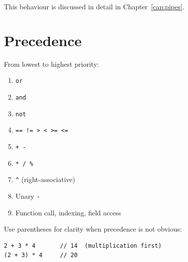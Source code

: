 This behaviour is discussed in detail in Chapter~\ref{cap:pipes}.

\section{Precedence}

From lowest to highest priority:

\begin{enumerate}
  \item \texttt{or}
  \item \texttt{and}
  \item \texttt{not}
  \item \texttt{== != > < >= <=}
  \item \texttt{+ -}
  \item \texttt{* / \%}
  \item \texttt{\^} (right-associative)
  \item Unary \texttt{-}
  \item Function call, indexing, field access
\end{enumerate}

Use parentheses for clarity when precedence is not obvious:

\begin{lstlisting}
2 + 3 * 4       // 14  (multiplication first)
(2 + 3) * 4     // 20
\end{lstlisting}
